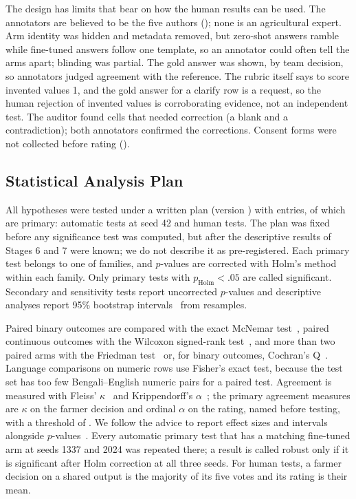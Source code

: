 The design has limits that bear on how the human results can be used. The annotators are believed to be the five authors (); none is an agricultural expert. Arm identity was hidden and metadata removed, but zero-shot answers ramble while fine-tuned answers follow one template, so an annotator could often tell the arms apart; blinding was partial. The gold answer was shown, by team decision, so annotators judged agreement with the reference. The rubric itself says to score invented values 1, and the gold answer for a clarify row is a request, so the human rejection of invented values is corroborating evidence, not an independent test. The auditor found \HumAuditCorrections cells that needed correction (a blank and a contradiction); both annotators confirmed the corrections. Consent forms were not collected before rating (\PENDINGCONSENT{}).



\subsection{Statistical Analysis Plan}
\label{sec:impl-plan}

All hypotheses were tested under a written plan (version \PlanVersion) with \PlanTests entries, of which \PlanTestsPrimary are primary: \SigAutoPrimaryTotal automatic tests at seed 42 and \SigHumPrimaryTotal human tests. The plan was fixed before any significance test was computed, but after the descriptive results of Stages 6 and 7 were known; we do not describe it as pre-registered. Each primary test belongs to one of \PlanHolmFamilies families, and $p$-values are corrected with Holm's method~\cite{holm1979simple} within each family. Only primary tests with $p_\mathrm{Holm} < .05$ are called significant. Secondary and sensitivity tests report uncorrected $p$-values and descriptive analyses report 95\% bootstrap intervals~\cite{efron1979bootstrap} from \PlanBootstrap resamples.

Paired binary outcomes are compared with the exact McNemar test~\cite{mcnemar1947note}, paired continuous outcomes with the Wilcoxon signed-rank test~\cite{wilcoxon1945individual}, and more than two paired arms with the Friedman test~\cite{friedman1937use} or, for binary outcomes, Cochran's Q~\cite{cochran1950comparison}. Language comparisons on numeric rows use Fisher's exact test, because the test set has too few Bengali--English numeric pairs for a paired test. Agreement is measured with Fleiss' $\kappa$~\cite{fleiss1971measuring} and Krippendorff's $\alpha$~\cite{hayes2007answering}; the primary agreement measures are $\kappa$ on the farmer decision and ordinal $\alpha$ on the rating, named before testing, with a threshold of \AgreeThreshold. We follow the advice to report effect sizes and intervals alongside $p$-values~\cite{dror2018hitchhiker}. Every automatic primary test that has a matching fine-tuned arm at seeds 1337 and 2024 was repeated there; a result is called robust only if it is significant after Holm correction at all three seeds. For human tests, a farmer decision on a shared output is the majority of its five votes and its rating is their mean.

